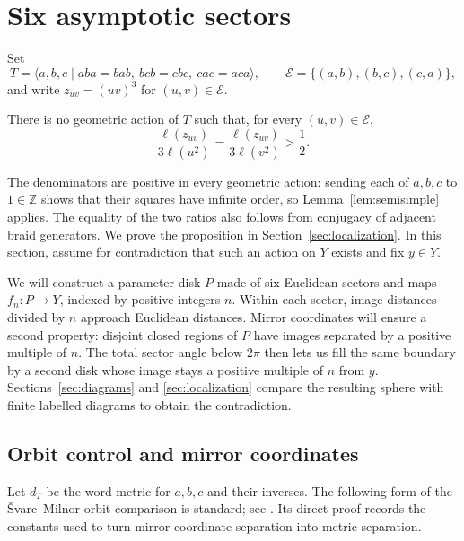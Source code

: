 \section{Six asymptotic sectors}\label{sec:sectors}

Set
\[
 T=\langle a,b,c\mid aba=bab,\ bcb=cbc,\ cac=aca\rangle,\qquad
 \mathcal E=\{(a,b),(b,c),(c,a)\},
\]
and write \(z_{uv}=(uv)^3\) for \((u,v)\in\mathcal E\).

\begin{proposition}\label{prop:triangle-obstruction}
There is no geometric action of \(T\) such that, for every
\((u,v)\in\mathcal E\),
\begin{equation}\label{eq:strict-ratios}
 \frac{\ell(z_{uv})}{3\ell(u^2)}
 =\frac{\ell(z_{uv})}{3\ell(v^2)}>\frac12.
\end{equation}
\end{proposition}

The denominators are positive in every geometric action: sending each
of \(a,b,c\) to \(1\in\mathbb Z\) shows that their squares have infinite
order, so Lemma~\ref{lem:semisimple} applies.  The equality of the two
ratios also follows from conjugacy of adjacent braid generators.
We prove the proposition in Section~\ref{sec:localization}.  In this
section, assume for contradiction that such an action on \(Y\) exists
and fix \(y\in Y\).

We will construct a parameter disk \(P\) made of six Euclidean sectors
and maps \(f_n:P\to Y\), indexed by positive integers \(n\).  Within
each sector, image distances divided by \(n\) approach Euclidean
distances.  Mirror coordinates will ensure a second property: disjoint
closed regions of \(P\) have images separated by a positive multiple
of \(n\).  The total sector angle below \(2\pi\) then lets us fill the
same boundary by a second disk whose image stays a positive multiple
of \(n\) from \(y\).  Sections~\ref{sec:diagrams} and
\ref{sec:localization} compare the resulting sphere with finite labelled
diagrams to obtain the contradiction.

\subsection{Orbit control and mirror coordinates}

Let \(d_T\) be the word metric for \(a,b,c\) and their inverses.
The following form of the \v{S}varc--Milnor orbit comparison is standard;
see \cite[I.8.18--19]{BridsonHaefliger1999}.  Its direct proof records
the constants used to turn mirror-coordinate separation into metric
separation.

